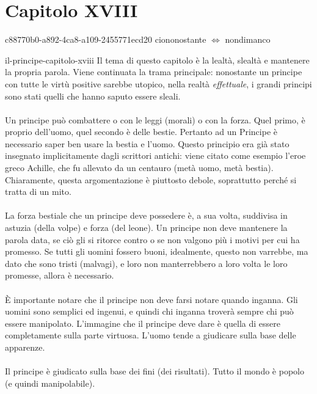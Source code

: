\documentclass[preview]{standalone}
\begin{document}
\genpage

\section{Capitolo XVIII}

\begin{snippetnote}{c88770b0-a892-4ca8-a109-2455771ecd20}{}
    ciononostante \(\iff\) nondimanco
\end{snippetnote}

\begin{snippet}{il-principe-capitolo-xviii}
    Il tema di questo capitolo è la lealtà, slealtà e mantenere
    la propria parola.
    Viene continuata la trama principale:
    nonostante un principe con tutte le virtù positive
    sarebbe utopico, nella realtà \textit{effettuale},
    i grandi principi sono stati quelli che hanno saputo essere sleali.
    \\\\
    Un principe può combattere o con le leggi (morali)
    o con la forza. Quel primo, è proprio dell'uomo, quel secondo
    è delle bestie.
    Pertanto ad un Principe è necessario saper ben usare la bestia e l'uomo.
    Questo principio era già stato insegnato implicitamente dagli scrittori antichi:
    viene citato come esempio l'eroe greco Achille, che fu allevato
    da un centauro (metà uomo, metà bestia).
    Chiaramente, questa argomentazione è piuttosto debole,
    soprattutto perché si tratta di un mito.
    \\\\
    La forza bestiale che un principe deve possedere è, a sua volta,
    suddivisa in astuzia (della volpe) e forza (del leone).
    Un principe non deve mantenere la parola data, se ciò
    gli si ritorce contro o se non valgono più i motivi per cui ha promesso.
    Se tutti gli uomini fossero buoni, idealmente, questo non varrebbe,
    ma dato che sono tristi (malvagi), e loro non manterrebbero
    a loro volta le loro promesse, allora è necessario.
    \\\\
    È importante notare che il principe non deve farsi notare
    quando inganna. Gli uomini sono semplici ed ingenui, e quindi
    chi inganna troverà sempre chi può essere manipolato.
    L'immagine che il principe deve dare
    è quella di essere completamente sulla parte virtuosa.
    L'uomo tende a giudicare sulla base delle apparenze.
    \\\\
    Il principe è giudicato sulla base dei fini (dei risultati).
    Tutto il mondo è popolo (e quindi manipolabile).
\end{snippet}
\end{document}
